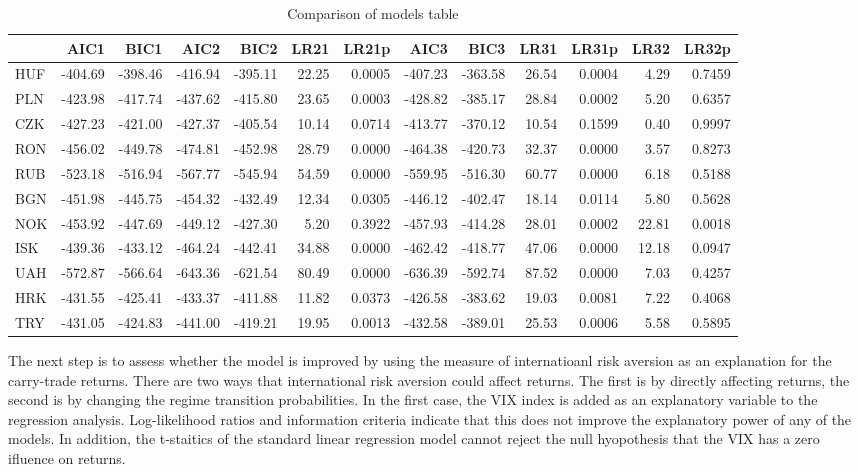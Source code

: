 \documentclass[12pt, a4paper, oneside]{article} %
\begin{document}
\begin{landscape}
\begin{table}[ht]
\centering
\begin{tabular}{l|rrrrrrrrrrrr}
  \hline
 & AIC1 & BIC1 & AIC2 & BIC2 & LR21 & LR21p & AIC3 & BIC3 & LR31 & LR31p & LR32 & LR32p \\ 
  \hline
HUF & -404.69 & -398.46 & -416.94 & -395.11 & 22.25 & 0.0005 & -407.23 & -363.58 & 26.54 & 0.0004 & 4.29 & 0.7459 \\ 
  PLN & -423.98 & -417.74 & -437.62 & -415.80 & 23.65 & 0.0003 & -428.82 & -385.17 & 28.84 & 0.0002 & 5.20 & 0.6357 \\ 
  CZK & -427.23 & -421.00 & -427.37 & -405.54 & 10.14 & 0.0714 & -413.77 & -370.12 & 10.54 & 0.1599 & 0.40 & 0.9997 \\ 
  RON & -456.02 & -449.78 & -474.81 & -452.98 & 28.79 & 0.0000 & -464.38 & -420.73 & 32.37 & 0.0000 & 3.57 & 0.8273 \\ 
  RUB & -523.18 & -516.94 & -567.77 & -545.94 & 54.59 & 0.0000 & -559.95 & -516.30 & 60.77 & 0.0000 & 6.18 & 0.5188 \\ 
  BGN & -451.98 & -445.75 & -454.32 & -432.49 & 12.34 & 0.0305 & -446.12 & -402.47 & 18.14 & 0.0114 & 5.80 & 0.5628 \\ 
  NOK & -453.92 & -447.69 & -449.12 & -427.30 & 5.20 & 0.3922 & -457.93 & -414.28 & 28.01 & 0.0002 & 22.81 & 0.0018 \\ 
  ISK & -439.36 & -433.12 & -464.24 & -442.41 & 34.88 & 0.0000 & -462.42 & -418.77 & 47.06 & 0.0000 & 12.18 & 0.0947 \\ 
  UAH & -572.87 & -566.64 & -643.36 & -621.54 & 80.49 & 0.0000 & -636.39 & -592.74 & 87.52 & 0.0000 & 7.03 & 0.4257 \\ 
  HRK & -431.55 & -425.41 & -433.37 & -411.88 & 11.82 & 0.0373 & -426.58 & -383.62 & 19.03 & 0.0081 & 7.22 & 0.4068 \\ 
  TRY & -431.05 & -424.83 & -441.00 & -419.21 & 19.95 & 0.0013 & -432.58 & -389.01 & 25.53 & 0.0006 & 5.58 & 0.5895 \\ 
   \hline
\end{tabular}
\caption{Comparison of models table} 
\label{tabref:comptab}
\end{table}
\end{landscape}

The next step is to assess whether the model is improved by using the measure of internatioanl risk aversion as an explanation for the carry-trade returns.  There are two ways that international risk aversion could affect returns.  The first is by directly affecting returns, the second is by changing the regime transition probabilities.  In the first case, the VIX index is added as an explanatory variable to the regression analysis.  Log-likelihood ratios and information criteria indicate that this does not improve the explanatory power of any of the models.  In addition, the t-staitics of the standard linear regression model cannot reject the null hyopothesis that the VIX has a zero ifluence on returns.  
\end{document}
